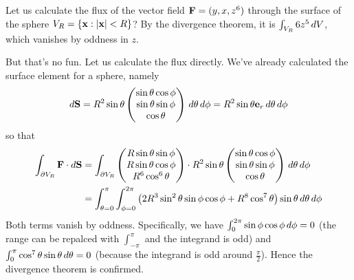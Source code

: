 \documentclass{../template/note}
\begin{document}
    \begin{example*}
        Let us calculate the flux of the vector field \(\V F = (y, x, z^6)\) through the surface of the sphere \(V_R = \{\V x: |\V x| < R\}\)? By the divergence theorem, it is \(\int_{V_R} 6z^5 \,d{V}\), which vanishes by oddness in \(z\).

        But that's no fun. Let us calculate the flux directly. We've already calculated the surface element for a sphere, namely
        \begin{align*}
            d\V S = R^2 \sin \theta \begin{pmatrix}
             \sin \theta \cos \phi \\
             \sin \theta \sin \phi \\
             \cos \theta \\
            \end{pmatrix} \D \theta \D \phi = R^2 \sin \theta \V e_r \D \theta \D \phi
        \end{align*}
        so that
        \begin{align*}
            \int_{\pr V_R} \V F \cdot d \V S &= \int_{\pr V_R} \begin{pmatrix}
             R \sin \theta \sin \phi \\
             R \sin \theta \cos \phi \\
             R^6 \cos^6 \theta \\
            \end{pmatrix} \cdot R^2 \sin \theta \begin{pmatrix}
             \sin \theta \cos \phi \\
             \sin \theta \sin \phi \\
             \cos \theta \\
            \end{pmatrix} \D \theta \D \phi \\
            &= \int_{\theta=0}^{\pi} \int_{\phi=0}^{2\pi} \left(2R^3 \sin^2 \theta \sin \phi \cos \phi + R^8 \cos^7 \theta\right) \sin \theta \D \theta \D \phi
        \end{align*}
        Both terms vanish by oddness. Specifically, we have \(\int_0^{2\pi} \sin \phi \cos \phi \,d{\phi} = 0\) (the range can be repalced with \(\int_{-\pi}^{\pi}\) and the integrand is odd) and \(\int_0^{\pi} \cos^7 \theta \sin \theta \,d{\theta} = 0\) (because the integrand is odd around \(\frac{\pi}2\)). Hence the divergence theorem is confirmed.        
    \end{example*}
    
\end{document}
